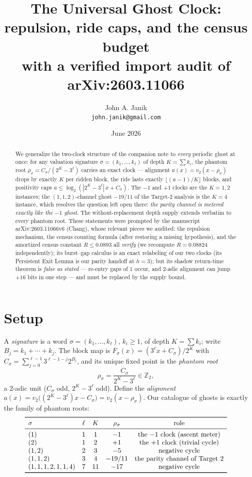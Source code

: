 \documentclass[11pt]{article}
\title{The Universal Ghost Clock:\\ repulsion, ride caps, and the census budget\\
\large with a verified import audit of arXiv:2603.11066}
\author{John A. Janik\\ \small\texttt{john.janik@gmail.com}}
\date{June 2026}
\newcommand{\vt}{v_2}
\begin{document}
\maketitle

\begin{abstract}
We generalize the two-clock structure of the companion note to
\emph{every} periodic ghost at once: for any valuation signature
$\sigma=(k_1,\dots,k_\ell)$ of depth $K=\sum k_i$, the phantom root
$\rho_\sigma=C_\sigma/(2^K-3^\ell)$ carries an exact clock --- alignment
$a(x)=\vt(x-\rho_\sigma)$ drops by exactly $K$ per ridden block, the
ride lasts exactly $\lfloor(a-1)/K\rfloor$ blocks, and positivity caps
$a\le\log_2(|2^K-3^\ell|\,x+C_\sigma)$. The $-1$ and $+1$ clocks are
the $K=1,2$ instances; the $(1,1,2)$-channel ghost $-19/11$ of the
Target-2 analysis is the $K=4$ instance, which resolves the question
left open there: \emph{the parity channel is metered exactly like the
$-1$ ghost}. The without-replacement depth supply extends verbatim to
every phantom root. These statements were prompted by the manuscript
arXiv:2603.11066v6 (Chang), whose relevant pieces we audited: the
repulsion mechanism, the census counting formula (after restoring a
missing hypothesis), and the amortized census constant
$R\le0.0893$ all \emph{verify} (we recompute $R=0.08824$
independently); its burst--gap calculus is an exact relabeling of our
two clocks (its Persistent Exit Lemma is our parity handoff at $h=3$);
but its shadow return-time theorem is \emph{false as stated} ---
re-entry gaps of $1$ occur, and 2-adic alignment can jump $+16$ bits
in one step --- and must be replaced by the supply bound.
\end{abstract}

\section{Setup}

A \emph{signature} is a word $\sigma=(k_1,\dots,k_\ell)$, $k_i\ge1$,
of depth $K=\sum k_i$; write $B_j=k_1+\cdots+k_j$. The block map is
$F_\sigma(x)=(3^\ell x+C_\sigma)/2^K$ with
$C_\sigma=\sum_{j=0}^{\ell-1}3^{\ell-1-j}2^{B_j}$, and its unique fixed
point is the \emph{phantom root}
\[
\rho_\sigma=\frac{C_\sigma}{2^K-3^\ell}\in\mathbb Z_2,
\]
a $2$-adic unit ($C_\sigma$ odd, $2^K-3^\ell$ odd). Define the
\emph{alignment} $a(x)=\vt\bigl((2^K-3^\ell)x-C_\sigma\bigr)
=\vt(x-\rho_\sigma)$. Our catalogue of ghosts is exactly the family of
phantom roots:
\[
\begin{array}{lcccc}
\toprule
\sigma & \ell & K & \rho_\sigma & \text{role}\\
\midrule
(1) & 1 & 1 & -1 & \text{the $-1$ clock (ascent meter)}\\
(2) & 1 & 2 & +1 & \text{the $+1$ clock (trivial cycle)}\\
(1,2) & 2 & 3 & -5 & \text{negative cycle}\\
(1,1,2) & 3 & 4 & -19/11 & \text{the parity channel of Target 2}\\
(1,1,1,2,1,1,4) & 7 & 11 & -17 & \text{negative cycle}\\
\bottomrule
\end{array}
\]
\end{document}
